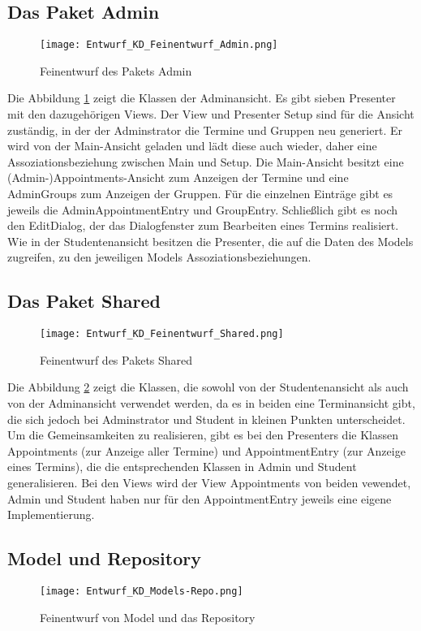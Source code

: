  \subsection{Das Paket Admin}
 \begin{figure}
  \texttt{[image: Entwurf\_KD\_Feinentwurf\_Admin.png]}
  \label{fig:Klassendiagramm_Admin}
  \caption{Feinentwurf des Pakets Admin}
 \end{figure}

 Die Abbildung \ref{fig:Klassendiagramm_Admin} zeigt die Klassen der Adminansicht. Es gibt sieben Presenter mit den dazugehörigen Views.
 Der View und Presenter Setup sind für die Ansicht zuständig, in der der Adminstrator die Termine und Gruppen neu generiert. Er wird von der Main-Ansicht geladen und lädt diese auch wieder, daher eine Assoziationsbeziehung zwischen Main und Setup.
 Die Main-Ansicht besitzt eine (Admin-)Appointments-Ansicht zum Anzeigen der Termine und eine AdminGroups zum Anzeigen der Gruppen.
 Für die einzelnen Einträge gibt es jeweils die AdminAppointmentEntry und GroupEntry.
 Schließlich gibt es noch den EditDialog, der das Dialogfenster zum Bearbeiten eines Termins realisiert.
 Wie in der Studentenansicht besitzen die Presenter, die auf die Daten des Models zugreifen, zu den jeweiligen Models Assoziationsbeziehungen.

 \subsection{Das Paket Shared}
 \begin{figure}
  \texttt{[image: Entwurf\_KD\_Feinentwurf\_Shared.png]}
  \label{fig:Klassendiagramm_Shared}
  \caption{Feinentwurf des Pakets Shared}
 \end{figure}

 Die Abbildung \ref{fig:Klassendiagramm_Shared} zeigt die Klassen, die sowohl von der Studentenansicht als auch von der Adminansicht verwendet werden, da es in beiden eine Terminansicht gibt, die sich jedoch bei Adminstrator und Student in kleinen Punkten unterscheidet.
 Um die Gemeinsamkeiten zu realisieren, gibt es bei den Presenters die Klassen Appointments (zur Anzeige aller Termine) und AppointmentEntry (zur Anzeige eines Termins), die die entsprechenden Klassen in Admin und Student generalisieren.
 Bei den Views wird der View Appointments von beiden vewendet, Admin und Student haben nur für den AppointmentEntry jeweils eine eigene Implementierung.

 \subsection{Model und Repository}
 \begin{figure}
  \texttt{[image: Entwurf\_KD\_Models-Repo.png]}
  \label{fig:Klassendiagramm_Models-Repo}
\caption{Feinentwurf von Model und das Repository}
 \end{figure}

